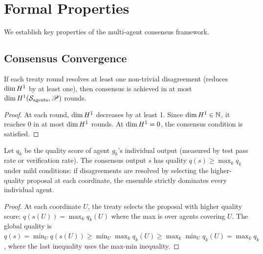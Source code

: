 \documentclass[11pt]{article}
\newcommand{\ProposalSheaf}{\mathscr{P}}
\newcommand{\AgentSite}{\mathcal{S}_{\mathrm{agents}}}
\begin{document}
\section{Formal Properties}\label{sec:formal-props}

We establish key properties of the multi-agent consensus framework.

\subsection{Consensus Convergence}\label{subsec:convergence}

\begin{theorem}\label{thm:treaty-converge}
If each treaty round resolves at least one non-trivial disagreement
(reduces $\dim H^{1}$ by at least one), then consensus is achieved
in at most $\dim \Hcoh{1}(\AgentSite, \ProposalSheaf)$ rounds.
\end{theorem}

\begin{proof}
At each round, $\dim H^{1}$ decreases by at least 1.  Since
$\dim H^{1} \in \mathbb{N}$, it reaches 0 in at most
$\dim H^{1}$ rounds.  At $\dim H^{1} = 0$, the consensus
condition is satisfied.
\end{proof}

\begin{theorem}\label{thm:ensemble-quality}
Let $q_k$ be the quality score of agent $g_k$'s individual output
(measured by test pass rate or verification rate).  The consensus
output $s$ has quality $q(s) \geq \max_k q_k$ under mild conditions:
if disagreements are resolved by selecting the higher-quality proposal
at each coordinate, the ensemble strictly dominates every individual
agent.
\end{theorem}

\begin{proof}
At each coordinate $U$, the treaty selects the proposal with higher
quality score: $q(s(U)) = \max_k q_k(U)$ where the max is over
agents covering $U$.  The global quality is $q(s) = \min_U q(s(U))
\geq \min_U \max_k q_k(U) \geq \max_k \min_U q_k(U) = \max_k q_k$,
where the last inequality uses the max-min inequality.
\end{proof}
\end{document}

